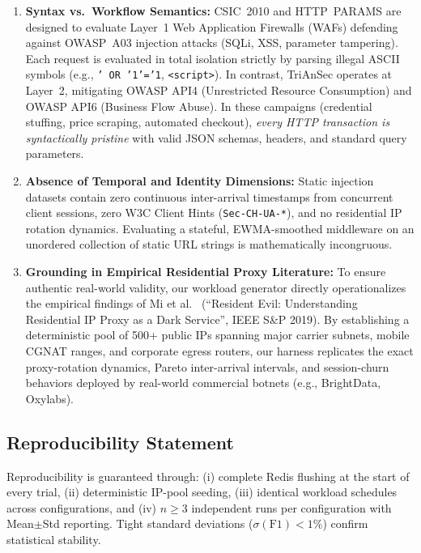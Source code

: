 \documentclass[journal,10pt]{IEEEtran}
\begin{document}
\begin{enumerate}
    \item \textbf{Syntax vs.\ Workflow Semantics:} CSIC~2010 and HTTP~PARAMS are designed to evaluate Layer~1 Web Application Firewalls (WAFs) defending against OWASP~A03 injection attacks (SQLi, XSS, parameter tampering). Each request is evaluated in total isolation strictly by parsing illegal ASCII symbols (e.g., \texttt{' OR '1'='1}, \texttt{<script>}). In contrast, TriAnSec operates at Layer~2, mitigating OWASP API4 (Unrestricted Resource Consumption) and OWASP API6 (Business Flow Abuse). In these campaigns (credential stuffing, price scraping, automated checkout), \emph{every HTTP transaction is syntactically pristine} with valid JSON schemas, headers, and standard query parameters.
    \item \textbf{Absence of Temporal and Identity Dimensions:} Static injection datasets contain zero continuous inter-arrival timestamps from concurrent client sessions, zero W3C Client Hints (\texttt{Sec-CH-UA-*}), and no residential IP rotation dynamics. Evaluating a stateful, EWMA-smoothed middleware on an unordered collection of static URL strings is mathematically incongruous.
    \item \textbf{Grounding in Empirical Residential Proxy Literature:} To ensure authentic real-world validity, our workload generator directly operationalizes the empirical findings of Mi et al.~\cite{mi2019resident} (``Resident Evil: Understanding Residential IP Proxy as a Dark Service'', IEEE S\&P 2019). By establishing a deterministic pool of 500+ public IPs spanning major carrier subnets, mobile CGNAT ranges, and corporate egress routers, our harness replicates the exact proxy-rotation dynamics, Pareto inter-arrival intervals, and session-churn behaviors deployed by real-world commercial botnets (e.g., BrightData, Oxylabs).
\end{enumerate}

\subsection{Reproducibility Statement}
Reproducibility is guaranteed through: (i) complete Redis flushing at the start of every trial, (ii) deterministic IP-pool seeding, (iii) identical workload schedules across configurations, and (iv) $n\ge 3$ independent runs per configuration with Mean$\pm$Std reporting. Tight standard deviations ($\sigma(\mathrm{F1}) < 1\%$) confirm statistical stability.

\end{document}

